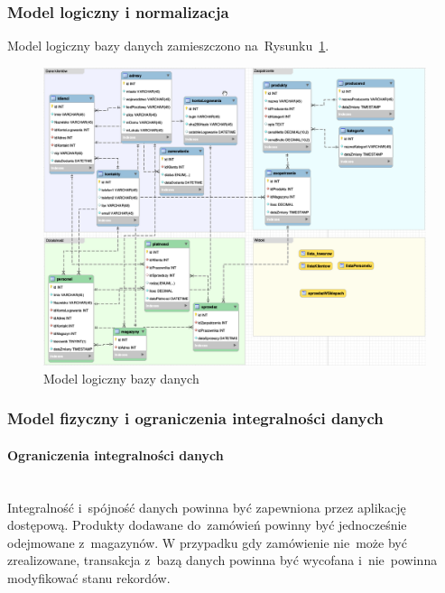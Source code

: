 \documentclass[a4paper, 12pt]{article}
\begin{document}
\subsubsection{Model logiczny i normalizacja}
Model logiczny bazy danych zamieszczono na~Rysunku~\ref{fig:modelLogiczny}.
\begin{figure}[H]
	\includegraphics[width=14cm]{modelLogiczny.png}
	\caption[Model logiczny bazy danych]{Model logiczny bazy danych}
	\label{fig:modelLogiczny}
\end{figure}
\subsubsection{Model fizyczny i ograniczenia integralności danych}
\paragraph{Ograniczenia integralności danych} \mbox{}\\
Integralność i~spójność danych powinna być zapewniona przez aplikację dostępową. Produkty dodawane do~zamówień powinny być jednocześnie odejmowane z~magazynów. W przypadku gdy zamówienie nie~może być zrealizowane, transakcja z~bazą danych powinna być wycofana i~nie~powinna modyfikować stanu rekordów.
\end{document}
